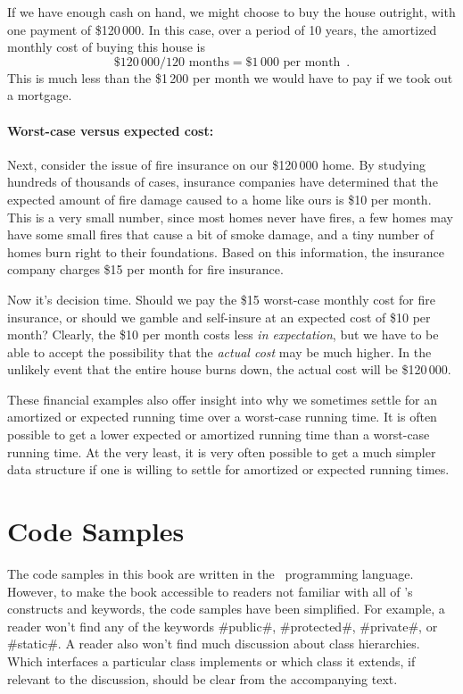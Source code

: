 If we have enough cash on hand, we might choose to buy the house outright,
with one payment of \$120\,000.  In this case, over a period of 10 years,
the amortized monthly cost of buying this house is
\[
   \$120\,000 / 120\text{ months} = \$1\,000\text{ per month} \enspace .
\]
This is much less than the \$1\,200 per month we would have to pay if
we took out a mortgage.

\paragraph{Worst-case versus expected cost:}
%
Next, consider the issue of fire insurance on our \$120\,000 home.
By studying hundreds of thousands of cases, insurance companies have
determined that the expected amount of fire damage caused to a home
like ours is \$10 per month.  This is a very small number, since most
homes never have fires, a few homes may have some small fires that
cause a bit of smoke damage, and a tiny number of homes burn right to
their foundations.  Based on this information, the insurance company
charges \$15 per month for fire insurance.

Now it's decision time. Should we pay the \$15 worst-case monthly cost
for fire insurance, or should we gamble and self-insure at an expected
cost of \$10 per month?  Clearly, the \$10 per month costs less \emph{in
expectation}, but we have to be able to accept the possibility that
the \emph{actual cost} may be much higher.  In the unlikely event that the
entire house burns down, the actual cost will be \$120\,000.

These financial examples also offer insight into why we sometimes settle
for an amortized or expected running time over a worst-case running time.
It is often possible to get a lower expected or amortized running time
than a worst-case running time. At the very least, it is very often possible
to get a much simpler data structure if one is willing to settle for
amortized or expected running times.

\section{Code Samples}

The code samples in this book are written in the \lang\ programming
language.  However, to make the book accessible to readers not familiar
with all of \lang's constructs and keywords, the code samples have
been simplified.  For example, a reader won't find any of the keywords
#public#, #protected#, #private#, or #static#.  A reader also won't find
much discussion about class hierarchies.  Which interfaces a particular
class implements or which class it extends, if relevant to the discussion,
should be clear from the accompanying text.

